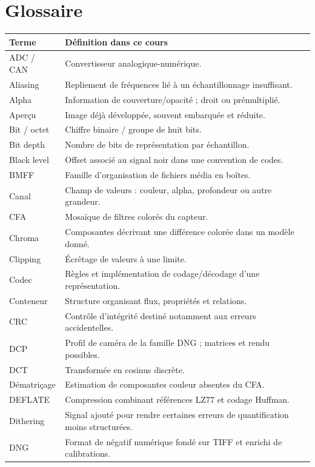 \section{Glossaire}
\begin{longtable}{p{3.4cm}p{11.2cm}}
\toprule Terme & Définition dans ce cours \\ \midrule
ADC / CAN & Convertisseur analogique-numérique. \\
Aliasing & Repliement de fréquences lié à un échantillonnage insuffisant. \\
Alpha & Information de couverture/opacité ; droit ou prémultiplié. \\
Aperçu & Image déjà développée, souvent embarquée et réduite. \\
Bit / octet & Chiffre binaire / groupe de huit bits. \\
Bit depth & Nombre de bits de représentation par échantillon. \\
Black level & Offset associé au signal noir dans une convention de codes. \\
BMFF & Famille d'organisation de fichiers média en boîtes. \\
Canal & Champ de valeurs : couleur, alpha, profondeur ou autre grandeur. \\
CFA & Mosaïque de filtres colorés du capteur. \\
Chroma & Composantes décrivant une différence colorée dans un modèle donné. \\
Clipping & Écrêtage de valeurs à une limite. \\
Codec & Règles et implémentation de codage/décodage d'une représentation. \\
Conteneur & Structure organisant flux, propriétés et relations. \\
CRC & Contrôle d'intégrité destiné notamment aux erreurs accidentelles. \\
DCP & Profil de caméra de la famille DNG ; matrices et rendu possibles. \\
DCT & Transformée en cosinus discrète. \\
Dématriçage & Estimation de composantes couleur absentes du CFA. \\
DEFLATE & Compression combinant références LZ77 et codage Huffman. \\
Dithering & Signal ajouté pour rendre certaines erreurs de quantification moins structurées. \\
DNG & Format de négatif numérique fondé sur TIFF et enrichi de calibrations. \\

\end{longtable}
